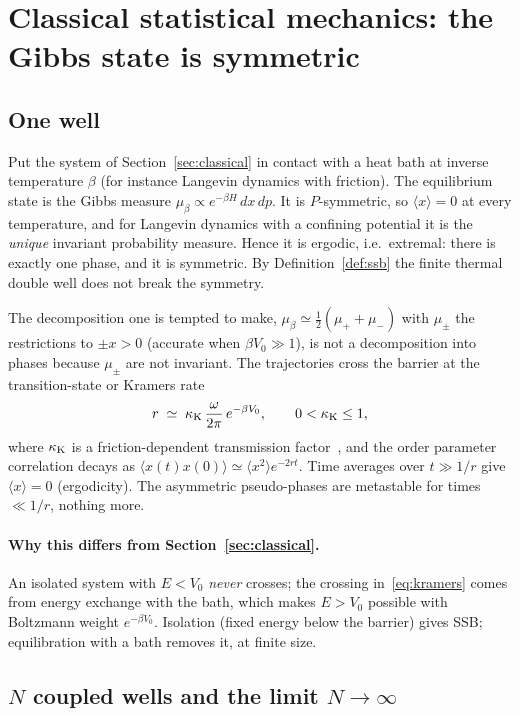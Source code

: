 \documentclass[11pt,a4paper]{article}
\theoremstyle{definition}
\theoremstyle{remark}
\newcommand{\ev}[1]{\langle #1\rangle}
\begin{document}
\section{Classical statistical mechanics: the Gibbs state is symmetric}\label{sec:stat}

\subsection{One well}

Put the system of Section~\ref{sec:classical} in contact with a heat bath at inverse temperature $\beta$ (for
instance Langevin dynamics with friction). The equilibrium state is the Gibbs measure
$\mu_\beta\propto e^{-\beta H}\,dx\,dp$. It is $P$-symmetric, so $\ev{x}=0$ at every temperature, and for
Langevin dynamics with a confining potential it is the \emph{unique} invariant probability measure. Hence it
is ergodic, i.e.\ extremal: there is exactly one phase, and it is symmetric. By Definition~\ref{def:ssb} the
finite thermal double well does not break the symmetry.

The decomposition one is tempted to make, $\mu_\beta\simeq\tfrac12(\mu_++\mu_-)$ with $\mu_\pm$ the restrictions
to $\pm x>0$ (accurate when $\beta V_0\gg1$), is not a decomposition into phases because $\mu_\pm$ are not
invariant. The trajectories cross the barrier at the transition-state or Kramers rate
\begin{equation}
r\;\simeq\;\kappa_{\rm K}\,\frac{\omega}{2\pi}\,e^{-\beta V_0},\qquad 0<\kappa_{\rm K}\le1,
\label{eq:kramers}
\end{equation}
where $\kappa_{\rm K}$ is a friction-dependent transmission factor~\cite{Kramers,Hanggi}, and the order parameter
correlation decays as $\ev{x(t)x(0)}\simeq\ev{x^2}e^{-2rt}$. Time averages over $t\gg1/r$ give $\ev{x}=0$ (ergodicity). The
asymmetric pseudo-phases are metastable for times $\ll 1/r$, nothing more.

\paragraph{Why this differs from Section~\ref{sec:classical}.} An isolated system with $E<V_0$ \emph{never}
crosses; the crossing in~\eqref{eq:kramers} comes from energy exchange with the bath, which makes $E>V_0$
possible with Boltzmann weight $e^{-\beta V_0}$. Isolation (fixed energy below the barrier) gives SSB;
equilibration with a bath removes it, at finite size.

\subsection{\texorpdfstring{$N$}{N} coupled wells and the limit \texorpdfstring{$N\to\infty$}{N to infinity}}
\end{document}
